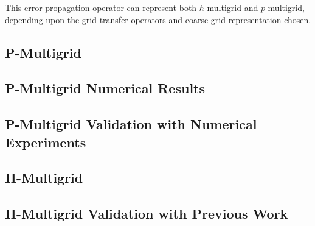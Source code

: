 This error propagation operator can represent both $h$-multigrid and $p$-multigrid, depending upon the grid transfer operators and coarse grid representation chosen.

\subsection{P-Multigrid}


\subsection{P-Multigrid Numerical Results}


\subsection{P-Multigrid Validation with Numerical Experiments}


\subsection{H-Multigrid}\label{sec:h-multigrid}


\subsection{H-Multigrid Validation with Previous Work}


